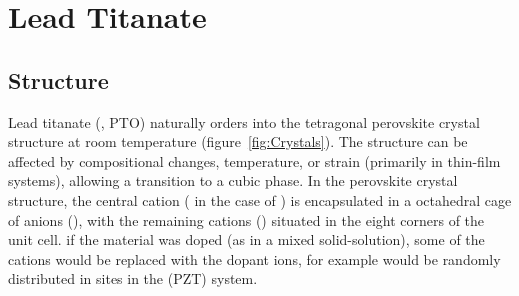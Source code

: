 \chapter{Lead Titanate}
\label{chap:Materials}
\thispagestyle{empty}



\section{Structure}
\label{sec:Materials-Struct}

Lead titanate (\PTO{}, PTO) naturally orders into the tetragonal perovskite crystal structure at room temperature (figure~\vref{fig:Crystals}). The structure can be affected by compositional changes, temperature, or strain (primarily in thin-film systems), allowing a transition to a cubic phase. In the perovskite crystal structure, the central cation (\TiIon{} in the case of \PTO{}) is encapsulated in a octahedral cage of anions (\OIon{}), with the remaining cations (\PbIon{}) situated in the eight corners of the unit cell. if the material was doped (as in a mixed solid-solution), some of the cations would be replaced with the dopant ions, for example \ZrIon{} would be randomly distributed in  \TiIon{} sites in the \PZT{} (PZT) system.



